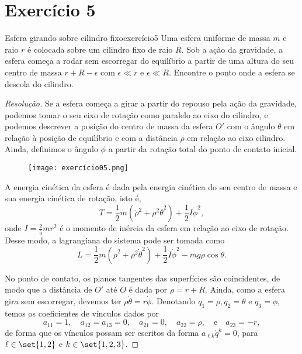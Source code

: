 \section*{Exercício 5}
\begin{exercício}{Esfera girando sobre cilindro fixo}{exercício5}
    Uma esfera uniforme de massa \(m\) e raio \(r\) é colocada sobre um cilindro fixo de raio \(R\).
    Sob a ação da gravidade, a esfera começa a rodar sem escorregar do equilíbrio a partir de uma altura do seu centro de massa \(r + R - \epsilon\) com \(\epsilon \ll r\) e \(\epsilon \ll R\). Encontre o ponto onde a esfera se descola do cilindro.
\end{exercício}
\begin{proof}[Resolução]
    Se a esfera começa a girar a partir do repouso pela ação da gravidade, podemos tomar o seu eixo de rotação como paralelo ao eixo do cilindro, e podemos descrever a posição do centro de massa da esfera \(O'\) com o ângulo \(\theta\) em relação à posição de equilíbrio e com a distância \(\rho\) em relação ao eixo cilindro. Ainda, definimos o ângulo \(\phi\) a partir da rotação total do ponto de contato inicial.
    \begin{figure}[h]
        \centering
        \texttt{[image: exercício05.png]}
    \end{figure}

    A energia cinética da esfera é dada pela energia cinética do seu centro de massa e sua energia cinética de rotação, isto é,
    \begin{equation*}
        T = \frac12 m\left(\dot\rho^2 + \rho^2\dot\theta^2\right) + \frac12 I\dot\phi^2,
    \end{equation*}
    onde \(I = \frac25 mr^2\) é o momento de inércia da esfera em relação ao eixo de rotação. Desse modo, a lagrangiana do sistema pode ser tomada como
    \begin{equation*}
        L =  \frac12 m\left(\dot\rho^2 + \rho^2\dot\theta^2\right) + \frac12 I\dot\phi^2 - mg\rho\cos\theta.
    \end{equation*}

    No ponto de contato, os planos tangentes das superfícies são coincidentes, de modo que a distância de \(O'\) até \(O\) é dada por \(\rho = r + R\). Ainda, como a esfera gira sem escorregar, devemos ter \(\rho\dot\theta = r\dot\phi\). Denotando \(q_1 = \rho, q_2 = \theta\) e \(q_3 = \phi\), temos os coeficientes de vínculos dados por
    \begin{equation*}
        a_{11} = 1,\quad a_{12} = a_{13} = 0, \quad a_{21} = 0,\quad a_{22} = \rho,\quad\text{e}\quad a_{23} = -r,
    \end{equation*}
    de forma que os vínculos possam ser escritos da forma \(a_{\ell k} \dot{q}^k = 0\), para \(\ell \in \set{1,2}\) e \(k \in \set{1,2,3}\).


\end{proof}
